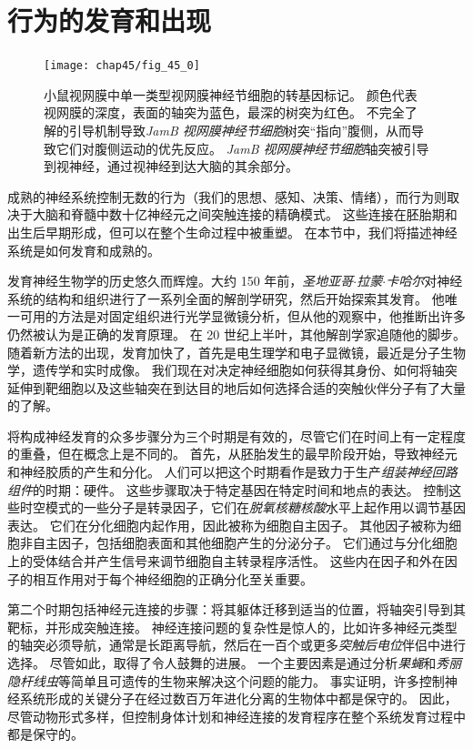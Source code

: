\part{行为的发育和出现}

\begin{figure}[htbp]
	\centering
	\texttt{[image: chap45/fig\_45\_0]}
	\caption{小鼠视网膜中单一类型视网膜神经节细胞的转基因标记。
		颜色代表视网膜的深度，表面的轴突为蓝色，最深的树突为红色。
		不完全了解的引导机制导致\textit{JamB 视网膜神经节细胞}树突“指向”腹侧，从而导致它们对腹侧运动的优先反应。
		\textit{JamB 视网膜神经节细胞}轴突被引导到视神经，通过视神经到达大脑的其余部分。}
	\label{fig:45_0}
\end{figure}


成熟的神经系统控制无数的行为（我们的思想、感知、决策、情绪），而行为则取决于大脑和脊髓中数十亿神经元之间突触连接的精确模式。
这些连接在胚胎期和出生后早期形成，但可以在整个生命过程中被重塑。
在本节中，我们将描述神经系统是如何发育和成熟的。


发育神经生物学的历史悠久而辉煌。大约 150 年前，\textit{圣地亚哥$\cdot$拉蒙$\cdot$卡哈尔}对神经系统的结构和组织进行了一系列全面的解剖学研究，然后开始探索其发育。
他唯一可用的方法是对固定组织进行光学显微镜分析，但从他的观察中，他推断出许多仍然被认为是正确的发育原理。
在 20 世纪上半叶，其他解剖学家追随他的脚步。
随着新方法的出现，发育加快了，首先是电生理学和电子显微镜，最近是分子生物学，遗传学和实时成像。
我们现在对决定神经细胞如何获得其身份、如何将轴突延伸到靶细胞以及这些轴突在到达目的地后如何选择合适的突触伙伴分子有了大量的了解。


将构成神经发育的众多步骤分为三个时期是有效的，尽管它们在时间上有一定程度的重叠，但在概念上是不同的。
首先，从胚胎发生的最早阶段开始，导致神经元和神经胶质的产生和分化。
人们可以把这个时期看作是致力于生产\textit{组装神经回路组件}的时期：硬件。
这些步骤取决于特定基因在特定时间和地点的表达。
控制这些时空模式的一些分子是转录因子，它们在\textit{脱氧核糖核酸}水平上起作用以调节基因表达。
它们在分化细胞内起作用，因此被称为细胞自主因子。
其他因子被称为细胞非自主因子，包括细胞表面和其他细胞产生的分泌分子。
它们通过与分化细胞上的受体结合并产生信号来调节细胞自主转录程序活性。
这些内在因子和外在因子的相互作用对于每个神经细胞的正确分化至关重要。


第二个时期包括神经元连接的步骤：将其躯体迁移到适当的位置，将轴突引导到其靶标，并形成突触连接。
神经连接问题的复杂性是惊人的，比如许多神经元类型的轴突必须导航，通常是长距离导航，然后在一百个或更多\textit{突触后电位}伴侣中进行选择。
尽管如此，取得了令人鼓舞的进展。
一个主要因素是通过分析\textit{果蝇}和\textit{秀丽隐杆线虫}等简单且可遗传的生物来解决这个问题的能力。
事实证明，许多控制神经系统形成的关键分子在经过数百万年进化分离的生物体中都是保守的。
因此，尽管动物形式多样，但控制身体计划和神经连接的发育程序在整个系统发育过程中都是保守的。


